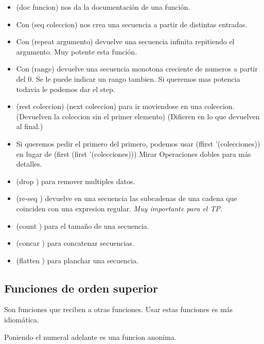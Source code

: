 \begin{itemize}
\item (doc funcion) nos da la documentación de una función.
\item Con (seq coleccion) nos crea una secuencia a partir de distintas entradas.
\item Con (repeat argumento) devuelve una secuencia infinita repitiendo el argumento. Muy potente esta función.
\item Con (range) devuelve una secuencia monotona creciente de numeros a partir del 0. Se le puede indicar un rango tambien. Si queremos mas potencia todavia le podemos dar el step.
\item (rest coleccion) (next coleccion) para ir moviendose en una coleccion. (Devuelven la coleccion sin el primer elemento) (Difieren en lo que devuelven al final.)
\item Si queremos pedir el primero del primero, podemos usar (ffirst '(colecciones)) en lugar de (first (first '(colecciones))) Mirar Operaciones dobles para más detalles.
\item (drop ) para remover multiples datos.
\item (re-seq ) devuelve en una secuencia las subcadenas de una cadena que coinciden con una expresion regular. \textit{Muy importante para el TP}.
\item (count ) para el tamaño de una secuencia.
\item (concar ) para concatenar secuencias.
\item (flatten ) para planchar una secuencia.
\end{itemize}



\subsection*{Funciones de orden superior}
Son funciones que reciben a otras funciones. Usar estas funciones es más idiomática.

Poniendo el numeral adelante es una funcion anonima.

